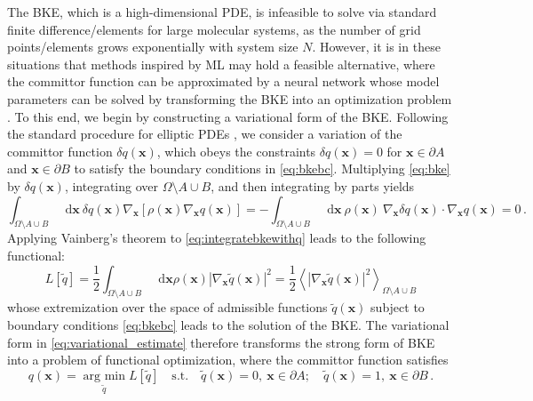 \documentclass{article}
\numberwithin{equation}{section}
\def\*#1{\mathbf{#1}}
\newcommand*\diff{\mathop{}\!\mathrm{d}}
\theoremstyle{definition}
\theoremstyle{remark}
\DeclareRobustCommand{\argmin}{\operatorname*{arg \ min}}
\begin{document}
The BKE, which is a high-dimensional PDE, is infeasible to solve via standard finite difference/elements for large molecular systems, as the number of grid points/elements grows exponentially with system size $N$.
However, it is in these situations that methods inspired by ML may hold a feasible alternative, where the committor function can be approximated by a neural network whose model parameters can be solved by transforming the BKE into an optimization problem \cite{khoo2019solving,li2019computing,rotskoff2020learning,li2021semigroup}.
To this end, we begin by constructing a variational form of the BKE. 
Following the standard procedure for elliptic PDEs \cite{panosfemnotes}, we consider a variation of the committor function $ \delta q (\* x) $, which obeys the constraints $ \delta q (\* x ) = 0 $ for $ \* x \in \partial A $ and $ \* x \in \partial B $ to satisfy the boundary conditions in \cref{eq:bkebc}.
Multiplying \cref{eq:bke} by $ \delta q (\* x) $, integrating over $ \Omega \setminus A \cup B$, and then integrating by parts yields
\begin{equation}
    \int_{\Omega \setminus A \cup B} \diff \* x \ \delta q(\* x) \nabla_{\* x} \left[ \rho(\* x) \nabla_{\* x} q(\* x)\right] = - \int_{\Omega  \setminus A \cup B }\diff \* x \ \rho(\* x) \ \nabla_{\* x}\delta q(\* x)  \cdot \nabla_{\* x} q(\* x) = 0 \,. \label{eq:integratebkewithq}
\end{equation}
Applying Vainberg's theorem \cite{panosfemnotes} to \cref{eq:integratebkewithq} leads to the following
functional: 
\begin{equation}
    L \left[ \tilde{q} \right] = \frac{1}{2} \int_{\Omega \setminus A \cup B} \diff \* x \rho(\* x) |\nabla_{\* x} \tilde{q}(\* x)|^2  = \frac{1}{2} \left\langle |\nabla_{\* x} \tilde{q}(\* x)|^2 \right\rangle_{\Omega  \setminus A \cup B } \label{eq:variational_estimate}
\end{equation}
whose extremization over the space of admissible functions $\tilde{q}(\* x)$ subject to boundary conditions \cref{eq:bkebc} leads to the solution of the BKE. 
The variational form in \cref{eq:variational_estimate} therefore transforms the strong form of BKE into a problem of functional optimization, where the committor function satisfies
\begin{equation}
    q (\* x) = \argmin_{\tilde{q}} L \left[ \tilde{q} \right] \quad \text{s.t.} \quad \tilde{q}(\* x) = 0, \ \* x \in  \partial A; \quad \tilde{q}(\* x) = 1, \ \* x \in \partial B \,. \label{eq:variational_problem}
\end{equation}
\end{document}
